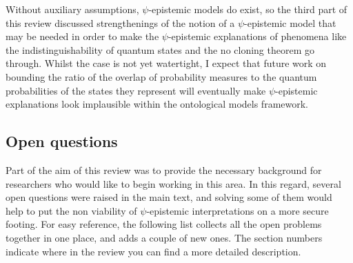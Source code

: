 \documentclass[DIV=calc,fontsize=12pt]{scrartcl} %
\theoremstyle{definition}
\theoremstyle{plain}
\begin{document}
Without auxiliary assumptions, $\psi$-epistemic models do exist, so
the third part of this review discussed strengthenings of the notion
of a $\psi$-epistemic model that may be needed in order to make the
$\psi$-epistemic explanations of phenomena like the
indistinguishability of quantum states and the no cloning theorem go
through.  Whilst the case is not yet watertight, I expect that future
work on bounding the ratio of the overlap of probability measures to
the quantum probabilities of the states they represent will eventually
make $\psi$-epistemic explanations look implausible within the
ontological models framework.

\subsection{Open questions}

Part of the aim of this review was to provide the necessary background
for researchers who would like to begin working in this area.  In this
regard, several open questions were raised in the main text, and
solving some of them would help to put the non viability of
$\psi$-epistemic interpretations on a more secure footing.  For easy
reference, the following list collects all the open problems together
in one place, and adds a couple of new ones.  The section numbers
indicate where in the review you can find a more detailed description.
\end{document}

